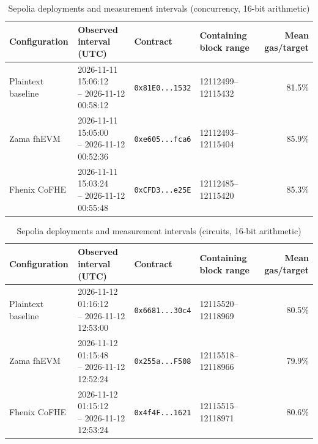 \begin{table}[!t]
\caption{Sepolia deployments and measurement intervals (concurrency, 16-bit arithmetic)}
\label{tab:sepolia-concurrency-deployments}
\centering
\footnotesize
\setlength{\tabcolsep}{4pt}
\begin{tabular}{|l|l|l|l|r|}
\hline
\textbf{Configuration} & \textbf{Observed interval (UTC)} & \textbf{Contract} & \textbf{Containing block range} & \textbf{Mean gas/target} \\
\hline
Plaintext baseline & \shortstack[l]{2026-11-11 15:06:12 \\ -- 2026-11-12 00:58:12} & \texttt{0x81E0...1532} & 12112499--12115432 & 81.5\% \\
\hline
Zama fhEVM & \shortstack[l]{2026-11-11 15:05:00 \\ -- 2026-11-12 00:52:36} & \texttt{0xe605...fca6} & 12112493--12115404 & 85.9\% \\
\hline
Fhenix CoFHE & \shortstack[l]{2026-11-11 15:03:24 \\ -- 2026-11-12 00:55:48} & \texttt{0xCFD3...e25E} & 12112485--12115420 & 85.3\% \\
\hline
\end{tabular}
\end{table}

\begin{table}[!t]
\caption{Sepolia deployments and measurement intervals (circuits, 16-bit arithmetic)}
\label{tab:sepolia-circuits-deployments}
\centering
\footnotesize
\setlength{\tabcolsep}{4pt}
\begin{tabular}{|l|l|l|l|r|}
\hline
\textbf{Configuration} & \textbf{Observed interval (UTC)} & \textbf{Contract} & \textbf{Containing block range} & \textbf{Mean gas/target} \\
\hline
Plaintext baseline & \shortstack[l]{2026-11-12 01:16:12 \\ -- 2026-11-12 12:53:00} & \texttt{0x6681...30c4} & 12115520--12118969 & 80.5\% \\
\hline
Zama fhEVM & \shortstack[l]{2026-11-12 01:15:48 \\ -- 2026-11-12 12:52:24} & \texttt{0x255a...F508} & 12115518--12118966 & 79.9\% \\
\hline
Fhenix CoFHE & \shortstack[l]{2026-11-12 01:15:12 \\ -- 2026-11-12 12:53:24} & \texttt{0x4f4F...1621} & 12115515--12118971 & 80.6\% \\
\hline
\end{tabular}
\end{table}
